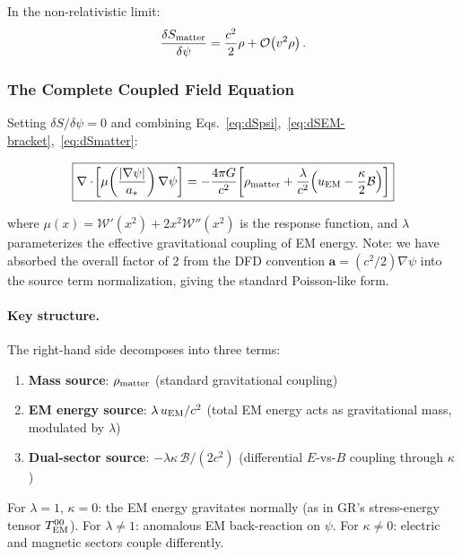 \documentclass[aps,prd,twocolumn,superscriptaddress,floatfix,nofootinbib]{revtex4-2}
\newcommand{\avec}{\mathbf{a}}
\newcommand{\astar}{a_*}
\newcommand{\Wfunc}{\mathcal{W}}
\newcommand{\mufunction}{\mu}
\newcommand{\lam}{\lambda}
\newcommand{\kap}{\kappa}
\newcommand{\order}[1]{\mathcal{O}\!\left(#1\right)}
\newcommand{\calB}{\mathcal{B}}
\begin{document}
In the non-relativistic limit:
\begin{equation}
\frac{\delta S_{\rm matter}}{\delta\psi} =
\frac{c^2}{2}\rho + \order{v^2\rho}.
\label{eq:dSmatter}
\end{equation}

\subsubsection{The Complete Coupled Field Equation}

Setting $\delta S/\delta\psi = 0$ and combining
Eqs.~\eqref{eq:dSpsi},~\eqref{eq:dSEM-bracket},~\eqref{eq:dSmatter}:

\begin{equation}
\boxed{
\nabla\cdot\!\left[\mufunction\!\left(\frac{|\nabla\psi|}{\astar}\right)
\nabla\psi\right] =
-\frac{4\pi G}{c^2}\!\left[
  \rho_{\rm matter}
  + \frac{\lam}{c^2}\!\left(u_{\rm EM} - \frac{\kap}{2}\calB\right)
\right]
}
\label{eq:master-field}
\end{equation}

where $\mufunction(x) = \Wfunc'(x^2) + 2x^2\Wfunc''(x^2)$ is the
response function, and $\lambda$ parameterizes the effective gravitational
coupling of EM energy. Note: we have absorbed the overall factor of 2
from the DFD convention $\avec = (c^2/2)\nabla\psi$ into the source term
normalization, giving the standard Poisson-like form.

\paragraph{Key structure.} The right-hand side decomposes into three terms:
\begin{enumerate}
\item \textbf{Mass source}: $\rho_{\rm matter}$ (standard gravitational coupling)
\item \textbf{EM energy source}: $\lambda\,u_{\rm EM}/c^2$ (total EM energy
acts as gravitational mass, modulated by $\lambda$)
\item \textbf{Dual-sector source}: $-\lambda\kap\,\calB/(2c^2)$ (differential
$E$-vs-$B$ coupling through $\kappa$)
\end{enumerate}

For $\lambda = 1$, $\kappa = 0$: the EM energy gravitates normally
(as in GR's stress-energy tensor $T^{00}_{\rm EM}$). For
$\lambda \neq 1$: anomalous EM back-reaction on $\psi$. For
$\kappa \neq 0$: electric and magnetic sectors couple differently.
\end{document}
